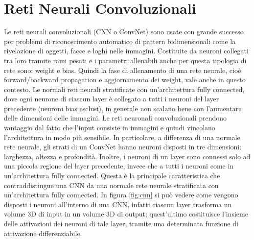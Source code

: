 \documentclass[twoside,twocolumn,10pt]{extarticle}
\theoremstyle{definition}
\begin{document}
\section{Reti Neurali Convoluzionali}\label{}
Le reti neurali convoluzionali (CNN o ConvNet) sono usate con grande successo per problemi di riconoscimento automatico di pattern bidimensionali come la rivelazione di oggetti, facce e loghi nelle immagini. Costituite da neuroni collegati tra loro tramite rami pesati e i parametri allenabili anche per questa tipologia di rete sono: weight e bias. Quindi la fase di allenamento di una rete neurale, cioè forward/backward propagation e aggiornamento dei weight, vale anche in questo contesto. Le normali reti neurali stratificate con un'architettura fully connected, dove ogni neurone di ciascun layer è collegato a tutti i neuroni del layer precedente (neuroni bias esclusi), in generale non scalano bene con l'aumentare delle dimensioni delle immagini. Le reti neuronali convoluzionali prendono vantaggio dal fatto che l'input consiste in immagini e quindi vincolano l'architettura in modo più sensibile. In particolare, a differenza di una normale rete neurale, gli strati di un ConvNet hanno neuroni disposti in tre dimensioni: larghezza, altezza e profondità. Inoltre, i neuroni di un layer sono connessi solo ad una piccola regione del layer precedente, invece che a tutti i neuroni come in un'architettura fully connected. Questa è la principale caratteristica che contraddistingue una CNN da una normale rete neurale stratificata con un'architettura fully connected. In figura \ref{fig:cnn} si può vedere come vengono disposti i neuroni all'interno di una CNN, infatti ciascun layer trasforma un volume 3D di input in un volume 3D di output; quest'ultimo costituisce l'insieme delle attivazioni dei neuroni di tale layer, tramite una determinata funzione di attivazione differenziabile.
\end{document}
